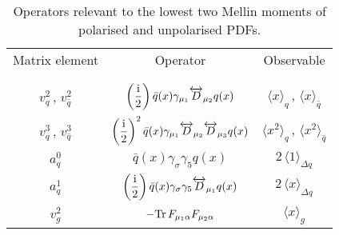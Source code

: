 \begin{table}
\caption{\label{Tab:twist2}
Operators relevant to the lowest two Mellin moments of polarised and unpolarised PDFs.
}
\begin{ruledtabular}%
\begin{tabular}{ccc}
Matrix element & Operator & Observable \\ 
\vspace*{-10pt}\\
\hline 
\vspace*{-10pt}\\
$v_q^2$\,, $v_{\bar{q}}^2$  & $\displaystyle \left(\frac{{\rm i}}{2}\right) \bar{q}(x)\gamma_{\mu_1} \overleftrightarrow{D}_{\mu_2} q(x)$ & $\langle x \rangle_q$\,, $\langle x \rangle_{\bar{q}}$   \\
$v_q^3$\,, $v_{\bar{q}}^3$  & $\displaystyle \left(\frac{{\rm i}}{2}\right)^2 \bar{q}(x)\gamma_{\mu_1} \overleftrightarrow{D}_{\mu_2} \overleftrightarrow{D}_{\mu_3} q(x)$ & $\langle x^2 \rangle_q$\,, $\langle x^2 \rangle_{\bar{q}}$ \\
$a_q^0$ & $\displaystyle \bar{q}(x)\gamma_{\sigma} \gamma_5 q(x)$ & $2\, \langle 1 \rangle_{\Delta q}$ \\
$a_q^1$ & $\displaystyle \left(\frac{{\rm i}}{2}\right) \bar{q}(x)\gamma_{\sigma} \gamma_5 \overleftrightarrow{D}_{\mu_1} q(x)$ & $2\, \langle x \rangle_{\Delta q}$ \\
$v_g^2$ & $\displaystyle - {\rm Tr}\, F_{\mu_1\alpha}F_{\mu_2\alpha}$ & $\langle x \rangle_g$ \\
\end{tabular}
\end{ruledtabular}
\end{table}

